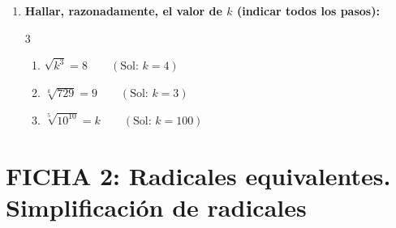 \documentclass[a4paper,12pt]{article}
\begin{document}
\begin{enumerate}[start=4]
    \item \textbf{Hallar, razonadamente, el valor de $k$ (indicar todos los pasos):}
    \begin{multicols}{3}
    \begin{enumerate}[label=\alph*)]
        \item $\sqrt{k^3} = 8 \qquad (\text{Sol: } k=4)$
        \item $\sqrt[k]{729} = 9 \qquad (\text{Sol: } k=3)$
        \item $\sqrt[5]{10^{10}} = k \qquad (\text{Sol: } k=100)$
    \end{enumerate}
    \end{multicols}
\end{enumerate}

\newpage

\section*{FICHA 2: Radicales equivalentes. Simplificación de radicales}
\end{document}
